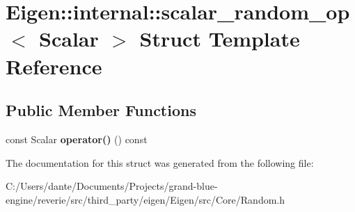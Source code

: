 \hypertarget{struct_eigen_1_1internal_1_1scalar__random__op}{}\section{Eigen\+::internal\+::scalar\+\_\+random\+\_\+op$<$ Scalar $>$ Struct Template Reference}
\label{struct_eigen_1_1internal_1_1scalar__random__op}
\subsection*{Public Member Functions}
\begin{DoxyCompactItemize}
\item 
\mbox{\label{struct_eigen_1_1internal_1_1scalar__random__op_a964c5cef167f29c4adec5025453dacc3}} 
const Scalar {\bfseries operator()} () const
\end{DoxyCompactItemize}


The documentation for this struct was generated from the following file\+:\begin{DoxyCompactItemize}
\item 
C\+:/\+Users/dante/\+Documents/\+Projects/grand-\/blue-\/engine/reverie/src/third\+\_\+party/eigen/\+Eigen/src/\+Core/Random.\+h\end{DoxyCompactItemize}
